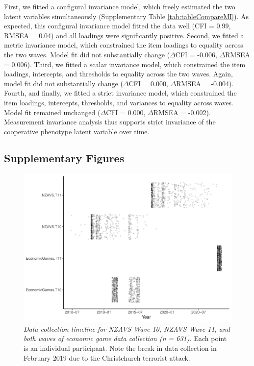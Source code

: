 \documentclass[
  man,floatsintext]{apa6}
\begin{document}
First, we fitted a configural invariance model, which freely estimated the two
latent variables simultaneously (Supplementary Table \ref{tab:tableCompareMI}).
As expected, this configural invariance model fitted the data well (CFI =
0.99, RMSEA =
0.04) and all loadings were
significantly positive. Second, we fitted a metric invariance model, which
constrained the item loadings to equality across the two waves. Model fit did
not substantially change (\(\Delta\)CFI =
-0.006,
\(\Delta\)RMSEA =
0.006).
Third, we fitted a scalar invariance model, which constrained the item
loadings, intercepts, and thresholds to equality across the two waves. Again,
model fit did not substantially change (\(\Delta\)CFI =
0.000,
\(\Delta\)RMSEA =
-0.004).
Fourth, and finally, we fitted a strict invariance model, which constrained the
item loadings, intercepts, thresholds, and variances to equality across waves.
Model fit remained unchanged (\(\Delta\)CFI =
0.000,
\(\Delta\)RMSEA =
-0.002).
Measurement invariance analysis thus supports strict invariance of the
cooperative phenotype latent variable over time.

\newpage

\hypertarget{supplementary-figures}{%
\subsection{Supplementary Figures}\label{supplementary-figures}}






\begin{figure}
\centering
\includegraphics{manuscript_files/figure-latex/timelinePlot-1.pdf}
\caption{\label{fig:timelinePlot}\emph{Data collection timeline for NZAVS Wave 10, NZAVS
Wave 11, and both waves of economic game data collection (n = 631).} Each point is an individual participant. Note
the break in data collection in February 2019 due to the Christchurch
terrorist attack.}
\end{figure}
\end{document}
